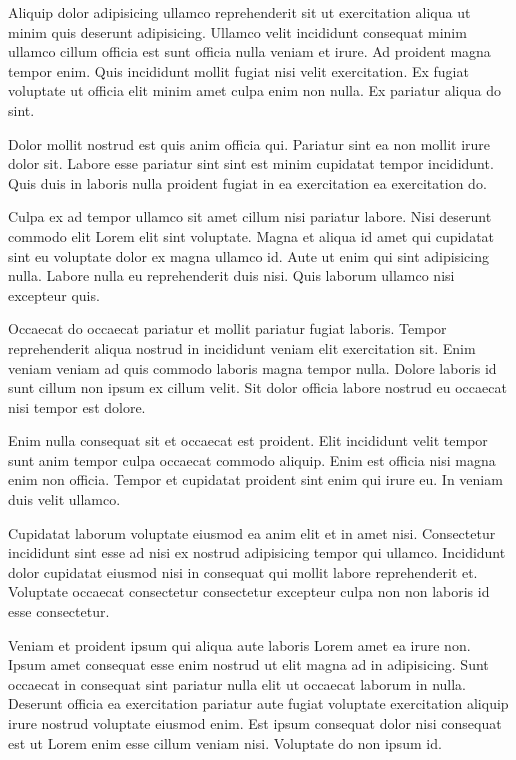 \documentclass[
    12pt,
    letterpaper,
    oneside,
    noraggedright
]{turabian-researchpaper}
\begin{document}
Aliquip dolor adipisicing ullamco reprehenderit sit ut exercitation
aliqua ut minim quis deserunt adipisicing. Ullamco velit incididunt
consequat minim ullamco cillum officia est sunt officia nulla veniam et
irure. Ad proident magna tempor enim. Quis incididunt mollit fugiat nisi
velit exercitation. Ex fugiat voluptate ut officia elit minim amet culpa
enim non nulla. Ex pariatur aliqua do sint.

Dolor mollit nostrud est quis anim officia qui. Pariatur sint ea non
mollit irure dolor sit. Labore esse pariatur sint sint est minim
cupidatat tempor incididunt. Quis duis in laboris nulla proident fugiat
in ea exercitation ea exercitation do.

Culpa ex ad tempor ullamco sit amet cillum nisi pariatur labore. Nisi
deserunt commodo elit Lorem elit sint voluptate. Magna et aliqua id amet
qui cupidatat sint eu voluptate dolor ex magna ullamco id. Aute ut enim
qui sint adipisicing nulla. Labore nulla eu reprehenderit duis nisi.
Quis laborum ullamco nisi excepteur quis.

Occaecat do occaecat pariatur et mollit pariatur fugiat laboris. Tempor
reprehenderit aliqua nostrud in incididunt veniam elit exercitation sit.
Enim veniam veniam ad quis commodo laboris magna tempor nulla. Dolore
laboris id sunt cillum non ipsum ex cillum velit. Sit dolor officia
labore nostrud eu occaecat nisi tempor est dolore.

Enim nulla consequat sit et occaecat est proident. Elit incididunt velit
tempor sunt anim tempor culpa occaecat commodo aliquip. Enim est officia
nisi magna enim non officia. Tempor et cupidatat proident sint enim qui
irure eu. In veniam duis velit ullamco.

Cupidatat laborum voluptate eiusmod ea anim elit et in amet nisi.
Consectetur incididunt sint esse ad nisi ex nostrud adipisicing tempor
qui ullamco. Incididunt dolor cupidatat eiusmod nisi in consequat qui
mollit labore reprehenderit et. Voluptate occaecat consectetur
consectetur excepteur culpa non non laboris id esse consectetur.

Veniam et proident ipsum qui aliqua aute laboris Lorem amet ea irure
non. Ipsum amet consequat esse enim nostrud ut elit magna ad in
adipisicing. Sunt occaecat in consequat sint pariatur nulla elit ut
occaecat laborum in nulla. Deserunt officia ea exercitation pariatur
aute fugiat voluptate exercitation aliquip irure nostrud voluptate
eiusmod enim. Est ipsum consequat dolor nisi consequat est ut Lorem enim
esse cillum veniam nisi. Voluptate do non ipsum id.
\end{document}
